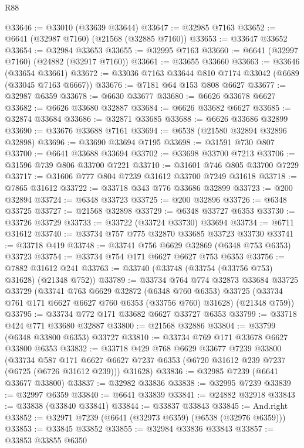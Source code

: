 \begin{lexlean}{R88}
\begin{coremodule}
@33646 := @33010 (@33639 @33644)
@33647 := @32985 @7163
@33652 := @6641 (@32987 @7160) (@21568 (@32885 @7160))
@33653 := @33647 @33652
@33654 := @32984 @33653
@33655 := @32995 @7163
@33660 := @6641 (@32997 @7160) (@24882 (@32917 @7160))
@33661 := @33655 @33660
@33663 := @33646 (@33654 @33661)
@33672 := @33036 @7163 @33644 @810 @7174 @33042 (@6689 (@33045 @7163 @6667))
@33676 := @7181 @64 @153 @808 @6627
@33677 := @32987 @6359
@33678 := @6630 @33677
@33680 := @6626 @33678 @6627
@33682 := @6626 @33680 @32887
@33684 := @6626 @33682 @6627
@33685 := @32874 @33684
@33686 := @32871 @33685
@33688 := @6626 @33686 @32899
@33690 := @33676 @33688 @7161
@33694 := @6538 (@21580 @32894 @32896 @32898)
@33696 := @33690 @33694 @7195
@33698 := @31591 @730 @807
@33700 := @6641 @33688 @33694
@33702 := @33698 @33700 @7213
@33706 := @31596 @739 @806 @33700 @7221
@33710 := @31601 @746 @805 @33700 @7229
@33717 := @31606 @777 @804 @7239 @31612 @33700 @7249 @31618
@33718 := @7865 @31612
@33722 := @33718 @343 @776 @33686 @32899
@33723 := @200 @32894
@33724 := @6348 @33723
@33725 := @200 @32896
@33726 := @6348 @33725
@33727 := @21568 @32898
@33729 := @6348 @33727 @6353
@33730 := @33726 @33729
@33733 := @33722 (@33724 @33730) @33694
@33734 := @6711 @31612
@33740 := @33734 @757 @775 @32870 @33685 @33723 @33730
@33741 := @33718 @419
@33748 := @33741 @756 @6629 @32869 (@6348 @753 @6353) @33723
@33754 := @33734 @754 @171 @6627 @6627 @753 @6353
@33756 := @7882 @31612 @241
@33763 := @33740 (@33748 (@33754 (@33756 @753) @31628) (@21348 @752))
@33789 := @33734
    @764
    @774
    @32873
    @33684
    @33725
    @33729
    (@33741
      @763
      @6629
      @32872
      (@6348 @760 @6353)
      @33725
      (@33734 @761 @171 @6627 @6627 @760 @6353 (@33756 @760) @31628)
      (@21348 @759))
@33795 := @33734 @772 @171 @33682 @6627 @33727 @6353
@33799 := @33718 @424 @771 @33680 @32887
@33800 := @21568 @32886
@33804 := @33799 (@6348 @33800 @6353) @33727
@33810 := @33734 @769 @171 @33678 @6627 @33800 @6353
@33832 := @33718
    @429
    @768
    @6629
    @33677
    @7239
    @33800
    (@33734
      @587
      @171
      @6627
      @6627
      @7237
      @6353
      (@6720 @31612 @239 @7237 (@6725 (@6726 @31612 @239)))
      @31628)
@33836 := @32985 @7239 (@6641 @33677 @33800)
@33837 := @32982 @33836
@33838 := @32995 @7239
@33839 := @32997 @6359
@33840 := @6641 @33839
@33841 := @24882 @32918
@33843 := @33838 (@33840 @33841)
@33844 := @33837 @33843
@33845 := And.right
@33852 := @32971 @7239 (@6641 (@32973 @6359) (@6538 (@32976 @6359)))
@33853 := @33845 @33852
@33855 := @32984 @33836 @33843
@33857 := @33853 @33855 @6350

\end{coremodule}
\end{lexlean}

